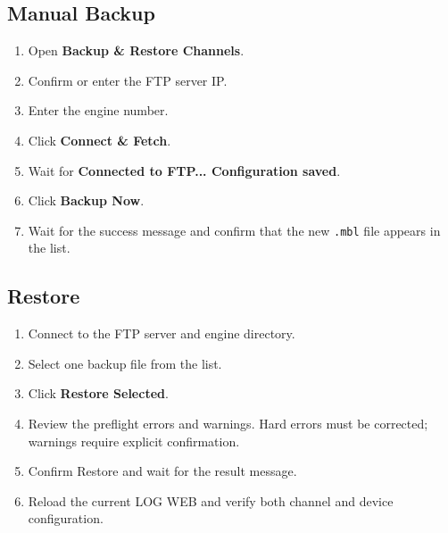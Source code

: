 \documentclass[11pt,a4paper]{article}
\begin{document}
\subsection{Manual Backup}
\begin{enumerate}
\item Open \textbf{Backup \& Restore Channels}.
\item Confirm or enter the FTP server IP.
\item Enter the engine number.
\item Click \textbf{Connect \& Fetch}.
\item Wait for \textbf{Connected to FTP... Configuration saved}.
\item Click \textbf{Backup Now}.
\item Wait for the success message and confirm that the new \texttt{.mbl} file appears in the list.
\end{enumerate}

\subsection{Restore}
\begin{enumerate}
\item Connect to the FTP server and engine directory.
\item Select one backup file from the list.
\item Click \textbf{Restore Selected}.
\item Review the preflight errors and warnings. Hard errors must be corrected; warnings require explicit confirmation.
\item Confirm Restore and wait for the result message.
\item Reload the current LOG WEB and verify both channel and device configuration.
\end{enumerate}
\end{document}
